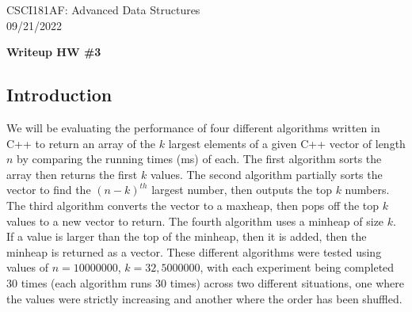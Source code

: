 \documentclass[11pt]{article}
\begin{document}
CSCI181AF: Advanced Data Structures\\
09/21/2022
\begin{center}
    \bf{Writeup HW \#3}
\end{center}
\subsection*{Introduction}
We will be evaluating the performance of four different algorithms written in C++ to return an array of the $k$ largest elements of a given C++ vector of length $n$ by comparing the running times (ms) of each. The first algorithm sorts the array then returns the first $k$ values.
The second algorithm partially sorts the vector to find the $(n-k)^{th}$ largest number, then outputs the top $k$ numbers. The third algorithm converts the vector to a maxheap, then pops off the top $k$ values to a new vector to return. The fourth algorithm
uses a minheap of size $k$. If a value is larger than the top of the minheap, then it is added, then the minheap is returned as a vector. These different algorithms were tested using values of $n = 10000000$, $k = 32, 5000000$, with each
experiment being completed 30 times (each algorithm runs 30 times) across two different situations, one where the values were strictly increasing and another where the order has been shuffled.
\vspace{-4mm}
\end{document}
